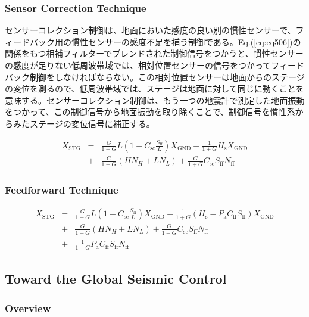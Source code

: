 \subsubsection{Sensor Correction Technique}
センサーコレクション制御は、地面においた感度の良い別の慣性センサーで、フィードバック用の慣性センサーの感度不足を補う制御である。Eq.(\ref{eq:eq506})の関係をもつ相補フィルターでブレンドされた制御信号をつかうと、慣性センサーの感度が足りない低周波帯域では、相対位置センサーの信号をつかってフィードバック制御をしなければならない。この相対位置センサーは地面からのステージの変位を測るので、低周波帯域では、ステージは地面に対して同じに動くことを意味する。センサーコレクション制御は、もう一つの地震計で測定した地面振動をつかって、この制御信号から地面振動を取り除くことで、制御信号を慣性系からみたステージの変位信号に補正する。



\begin{eqnarray}\nonumber
  X_{\mathrm{STG}} &=&\frac{G}{1+G}L\left(1-C_{\mathrm{sc}}\frac{S_{\mathrm{ff}}}{L}\right) X_{\mathrm{GND}} + \frac{1}{1+G}H_{\mathrm{s}}X_{\mathrm{GND}}\\ 
  &+& \frac{G}{1+G}\left(HN_{H}+LN_{L}\right) + \frac{G}{1+G}C_{\mathrm{sc}}S_{\mathrm{ff}}N_{\mathrm{ff}}
\end{eqnarray}\label{eq:eq511}

\subsubsection{Feedforward Technique}
\begin{eqnarray}\nonumber
  X_{\mathrm{STG}} &=&\frac{G}{1+G}L\left(1-C_{\mathrm{sc}}\frac{S_{\mathrm{ff}}}{L}\right) X_{\mathrm{GND}} + \frac{1}{1+G}\left(H_{\mathrm{s}}-P_{\mathrm{a}} C_{\mathrm{ff}} S_{\mathrm{ff}}\right) X_{\mathrm{GND}}\\ \nonumber
  &+& \frac{G}{1+G}\left(HN_{H}+LN_{L}\right) + \frac{G}{1+G}C_{\mathrm{sc}}S_{\mathrm{ff}}N_{\mathrm{ff}} \\ 
  &+& \frac{1}{1+G}P_{\mathrm{a}} C_{\mathrm{ff}}S_{\mathrm{ff}}N_{\mathrm{ff}}
\end{eqnarray}\label{eq:eq512}


\subsection{Toward the Global Seismic Control}
\subsubsection{Overview}
